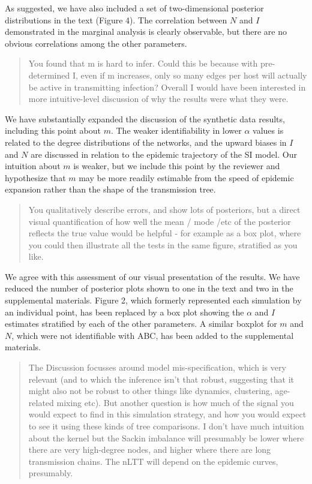 \documentclass[12pt]{letter}
\begin{document}
\begin{letter}{ }
As suggested, we have also included a set of two-dimensional posterior
distributions in the text (Figure 4). The correlation between $N$ and $I$
demonstrated in the marginal analysis is clearly observable, but there are no
obvious correlations among the other parameters.

\begin{quote}
  \itshape

  You found that m is hard to infer. Could this be because with pre-determined
  I, even if m increases, only so many edges per host will actually be active
  in transmitting infection? Overall I would have been interested in more
  intuitive-level discussion of why the results were what they were.
\end{quote}

We have substantially expanded the discussion of the synthetic data results,
including this point about $m$. The weaker identifiability in lower $\alpha$
values is related to the degree distributions of the networks, and the upward
biases in $I$ and $N$ are discussed in relation to the epidemic trajectory of
the SI model. Our intuition about $m$ is weaker, but we include this point by
the reviewer and hypothesize that $m$ may be more readily estimable from the
speed of epidemic expansion rather than the shape of the transmission tree.

\begin{quote}
  \itshape

  You qualitatively describe errors, and show lots of posteriors, but a direct
  visual quantification of how well the mean / mode /etc of the posterior
  reflects the true value would be helpful - for example as a box plot, where
  you could then illustrate all the tests in the same figure, stratified as you
  like.
\end{quote}

We agree with this assessment of our visual presentation of the results. We
have reduced the number of posterior plots shown to one in the text and two in
the supplemental materials. Figure 2, which formerly represented each
simulation by an individual point, has been replaced by a box plot showing the
$\alpha$ and $I$ estimates stratified by each of the other parameters. A
similar boxplot for $m$ and $N$, which were not identifiable with ABC, has been
added to the supplemental materials.

\begin{quote}
  \itshape

  The Discussion focusses around model mis-specification, which is very
  relevant (and to which the inference isn't that robust, suggesting that it
  might also not be robust to other things like dynamics, clustering,
  age-related mixing etc). But another question is how much of the signal you
  would expect to find in this simulation strategy, and how you would expect to
  see it using these kinds of tree comparisons. I don't have much intuition
  about the kernel but the Sackin imbalance will presumably be lower where
  there are very high-degree nodes, and higher where there are long
  transmission chains. The nLTT will depend on the epidemic curves, presumably.
\end{quote}


\end{letter}
\end{document}
